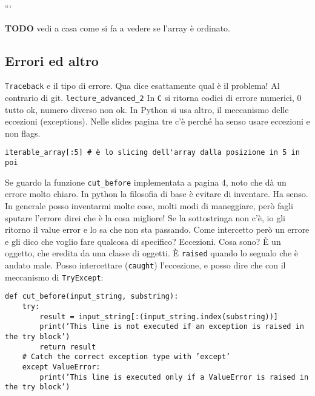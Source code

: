 \documentclass[10pt, a4paper, titlepage]{book}
\begin{document}
```

\textbf{TODO} vedi a casa come si fa a vedere se l'array è ordinato.

\subsection{Errori ed altro}

\texttt{Traceback} e il tipo di errore.
Qua dice esattamente qual è il problema! Al contrario di git.
\texttt{lecture\_advanced\_2}
In \texttt{C} si ritorna codici di errore numerici, 0 tutto ok, numero diverso non ok.
In Python si usa altro, il meccanismo delle eccezioni (exceptions).
Nelle slides pagina tre c'è perché ha senso usare eccezioni e non flags.

\begin{verbatim}
iterable_array[:5] # è lo slicing dell'array dalla posizione in 5 in poi
\end{verbatim}

Se guardo la funzione \texttt{cut_before} implementata a pagina 4, noto che dà un errore molto chiaro.
In python la filosofia di base è evitare di inventare. Ha senso. In generale posso inventarmi molte cose, molti modi di maneggiare, però fagli sputare l'errore direi che è la cosa migliore! Se la sottostringa non c'è, io gli ritorno il value error e lo sa che non sta passando.
Come intercetto però un errore e gli dico che voglio fare qualcosa di specifico?
Eccezioni.
Cosa sono? È un oggetto, che eredita da una classe di oggetti.
È \texttt{raised} quando lo segnalo che è andato male.
Posso intercettare (\texttt{caught}) l'eccezione, e posso dire che con il meccanismo di \texttt{TryExcept}:

\begin{verbatim}
def cut_before(input_string, substring):
	try:
		result = input_string[:(input_string.index(substring))]
		print(’This line is not executed if an exception is raised in the try block’)
		return result
	# Catch the correct exception type with ’except’
	except ValueError:
		print(’This line is executed only if a ValueError is raised in the try block’)
\end{verbatim}
\end{document}
